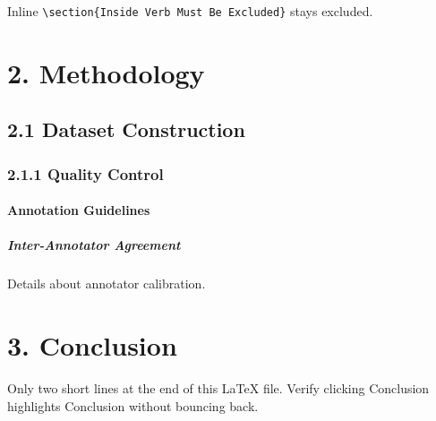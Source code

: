 \documentclass{article}
\begin{document}
Inline \verb|\section{Inside Verb Must Be Excluded}| stays excluded.

\section{2. Methodology}
\label{sec:method}

\subsection{2.1 Dataset Construction}

\subsubsection{2.1.1 Quality Control}

\paragraph{Annotation Guidelines}

\subparagraph{Inter-Annotator Agreement}

Details about annotator calibration.

\section{3. Conclusion}
Only two short lines at the end of this LaTeX file.
Verify clicking Conclusion highlights Conclusion without bouncing back.
\end{document}
